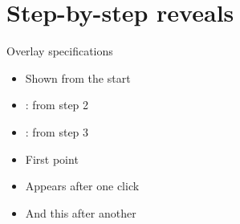 \section{Step-by-step reveals}

\begin{frame}{Overlay specifications}
  \begin{itemize}
    \item Shown from the start
    \item<2-> : from step 2
    \item<3-> : from step 3
  \end{itemize}


\end{frame}

\begin{frame}{}
  \begin{itemize}
    \item First point
    \pause
    \item Appears after one click
    \pause
    \item And this after another
  \end{itemize}
\end{frame}
